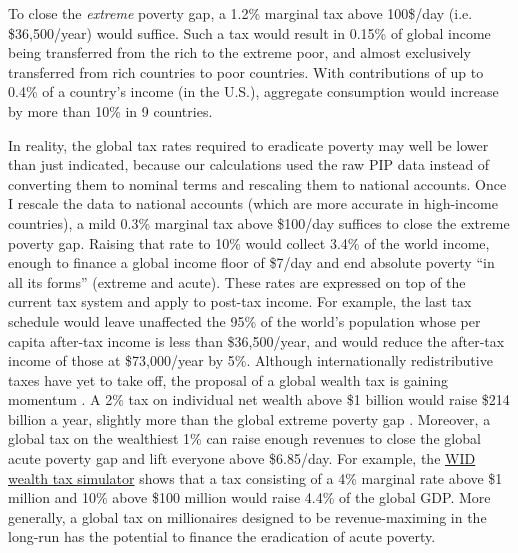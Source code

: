 \documentclass[12pt,english]{article}
\begin{document}
To close the \textit{extreme} poverty gap, a 1.2\% marginal tax %
above 100\$/day (i.e. \$36,500/year) would suffice. %
Such a tax would result in 0.15\% of global income being transferred from the rich to the extreme poor, and almost exclusively transferred from rich countries to poor countries. 
With contributions of up to 0.4\% of a country's income (in the U.S.), aggregate consumption would increase by more than 10\% in 9 countries. 

In reality, the global tax rates required to eradicate poverty may well be lower than just indicated, because our calculations used the raw PIP data instead of converting them to nominal terms and rescaling them to national accounts. Once I rescale the data to national accounts (which are more accurate in high-income countries), %
a mild 0.3\% marginal tax above \$100/day suffices to close the extreme poverty gap. Raising that rate to 10\% would collect 3.4\% of the world income, enough to finance a global income floor of \$7/day and end absolute poverty ``in all its forms'' (extreme and acute). %
These rates are expressed on top of the current tax system and apply to post-tax income. For example, the last tax schedule would leave unaffected the 95\% of the world's population whose per capita after-tax income is less than \$36,500/year, and would reduce the after-tax income of those at \$73,000/year by 5\%. 
Although internationally redistributive taxes have yet to take off, the proposal of a global wealth tax is gaining momentum \citep{piketty_brief_2022}. A 2\% tax on individual net wealth above \$1 billion would raise \$214 billion a year, slightly more than the global extreme poverty gap \citep{alstadsaeter_global_2024}. Moreover, a global tax on the wealthiest 1\% can raise enough revenues to close the global acute poverty gap and lift everyone above \$6.85/day. For example, the \href{https://wid.world/world-wealth-tax-simulator}{WID wealth tax simulator} shows that a tax consisting of a 4\% marginal rate above \$1 million and 10\% above \$100 million would raise 4.4\% of the global GDP. More generally, a global tax on millionaires designed to be revenue-maximing in the long-run has the potential to finance the eradication of acute poverty. 
\end{document}
